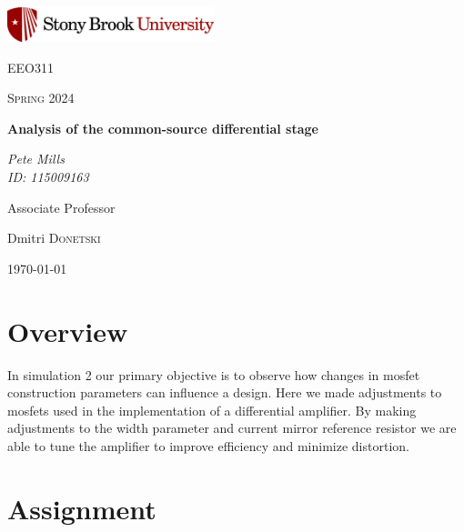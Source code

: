 \documentclass{article}
\begin{document}
	
\begin{titlepage}
	\centering
	\includegraphics[width=0.45\textwidth]{sbu}\par\vspace{1cm}
	{\LARGE \textsc{EEO311}\par}
	\vspace{1cm}
	{\Large \textsc{Spring 2024}\par}
	\vspace{1.5cm}
	{\huge\bfseries Analysis of the common-source differential stage\par}
	\vspace{2cm}
	{\Large\itshape Pete Mills\\ID: 115009163\par}
	\vfill
	Associate Professor\par
	Dmitri \textsc{Donetski}

	\vfill

	{\large \today\par}
\end{titlepage}

	\newcommand{\assName}{EEO311 Simulation assignment 2_AnalysisOfCommonSourceGainStage}

	
	
	

	\section*{Overview}
	
	 In simulation 2 our primary objective is to observe how changes in mosfet construction parameters can influence a design. Here we made adjustments to mosfets used in the implementation of a differential amplifier. By making adjustments to the width parameter and current mirror reference resistor we are able to tune the amplifier to improve efficiency and minimize distortion.
	
	\section{Assignment}
\end{document}
